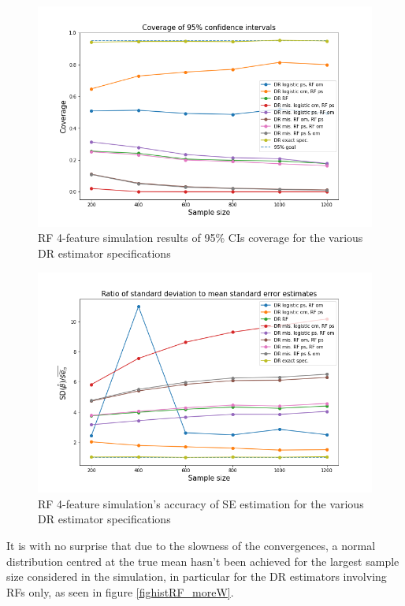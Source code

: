 \documentclass[12pt,twoside]{article}
\begin{document}
\begin{figure}[h!]
    \centering
    \includegraphics[width = 0.9\columnwidth]{figures/CIRF_moreW.png}
    \caption{RF 4-feature simulation results of 95\% CIs coverage for the various DR estimator specifications}
    \label{figCIRF_moreW}
\end{figure}

\begin{figure}[h!]
    \centering
    \includegraphics[width = 0.9\columnwidth]{figures/SERF_moreW.png}
    \caption{RF 4-feature simulation's accuracy of \citet{lunceford_davidian} SE estimation for the various DR estimator specifications}
    \label{figSERF_moreW}
\end{figure}

It is with no surprise that due to the slowness of the convergences, a normal distribution centred at the true mean hasn't been achieved for the largest sample size considered in the simulation, in particular for the DR estimators involving RFs only, as seen in figure \ref{fighistRF_moreW}. \\
\end{document}
